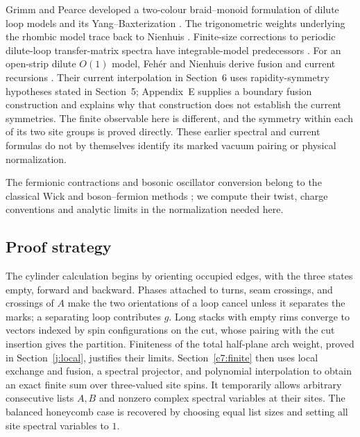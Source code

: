 Grimm and Pearce developed a two-colour braid--monoid formulation of
dilute loop models and its Yang--Baxterization
\cite[Sections~4.2 and~4.6]{GrimmPearce1993}. The trigonometric weights
underlying the rhombic model trace back to Nienhuis
\cite{Nienhuis1990CriticalMulticritical,GlazmanManolescu2017}.
Finite-size corrections to periodic dilute-loop transfer-matrix spectra
have integrable-model predecessors \cite{ZhouBatchelor1997}.
For an open-strip dilute $O(1)$ model, Feh\'er and Nienhuis derive fusion
and current recursions \cite{FeherNienhuis2018}. Their current interpolation
in Section~6 uses rapidity-symmetry hypotheses stated in Section~5;
Appendix~E supplies a boundary fusion construction and explains why that
construction does not establish the current symmetries. The finite observable
here is different, and the symmetry within each of its two site groups is
proved directly. These earlier spectral and current formulas do not by
themselves identify its marked vacuum pairing or physical normalization.

The fermionic contractions and bosonic oscillator conversion belong to
the classical Wick and boson--fermion methods
\cite{Wick1950,Frenkel1981,FrenkelJingWang2000}; we compute their
twist, charge conventions and analytic limits in the normalization
needed here.

\subsection{Proof strategy}

The cylinder calculation begins by orienting occupied edges, with the
three states empty, forward and backward. Phases attached to turns,
seam crossings, and crossings of $A$ make the two orientations of a
loop cancel unless it separates the marks; a separating loop contributes
$g$. Long stacks with empty rims converge to vectors indexed by spin
configurations on the cut, whose pairing with the cut insertion gives
the partition. Finiteness of the total half-plane arch weight, proved in
Section~\ref{j:local}, justifies their limits. Section~\ref{c7:finite}
then uses local exchange and fusion, a spectral projector, and
polynomial interpolation to obtain an exact finite sum over three-valued
site spins. It temporarily allows arbitrary consecutive lists $A,B$
and nonzero complex spectral variables at their sites. The balanced
honeycomb case is recovered by choosing equal list sizes and setting
all site spectral variables to $1$.

